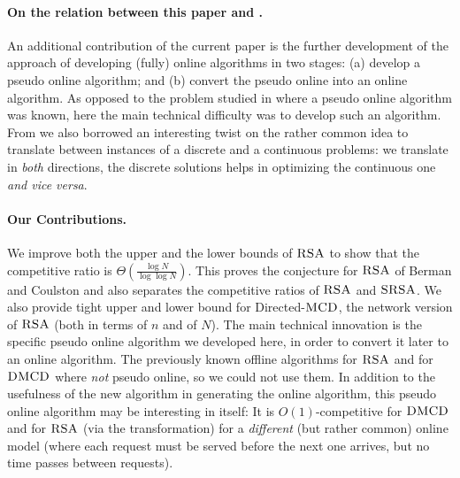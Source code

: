 \documentclass[11pt]{article}
\newcommand{\MCD}{\mbox{\sc MCD}}
\newcommand{\DMCD}{\mbox{\sc DMCD}}
\newcommand{\SRSA}{\mbox{\sc SRSA}}
\newcommand{\RSA}{\mbox{\sc RSA}}
\begin{document}
\paragraph*{On the relation between this paper and \cite{KK2014}.}
An additional contribution of the current paper is the further development of the approach of developing (fully) online algorithms in two stages:
(a) develop a pseudo online algorithm; and
(b) convert the pseudo online into an online algorithm.
As opposed to the problem studied in \cite{KK2014} where a pseudo online algorithm was known, here the main technical difficulty was to develop such an algorithm.
From \cite{KK2014} we also borrowed an interesting twist on the rather common idea to translate between instances of a discrete and a continuous problems: we translate in {\em both} directions, the discrete  solutions helps in optimizing the continuous one {\em and vice versa}.




\paragraph*{Our Contributions.}
We improve both the upper and the lower bounds of $\RSA$  to show that the competitive ratio is $\Theta(\frac{\log N}{\log \log N})$.
This proves the conjecture for $\RSA$ of  Berman and Coulston  \cite{berman} and also separates the competitive ratios of $\RSA$ and $\SRSA$.
We also provide tight upper and lower bound for Directed-$\MCD$, the network version of $\RSA$ (both in terms of  $n$ and of $N$).
The main technical innovation is the specific pseudo online algorithm we developed here,
in order to convert it later to an online algorithm.
The previously known offline algorithms for $\RSA$ and for $\DMCD$ where {\em not} pseudo online, so we could not use them.
In addition to the usefulness of the new algorithm in generating the online algorithm, this pseudo online algorithm may be interesting in itself:
It is $O(1)$-competitive for $\DMCD$ and for $\RSA$ (via the transformation)
for a {\em different} (but rather common) online model (where
each request must be served before the next one arrives, but no time passes between requests).
\end{document}
